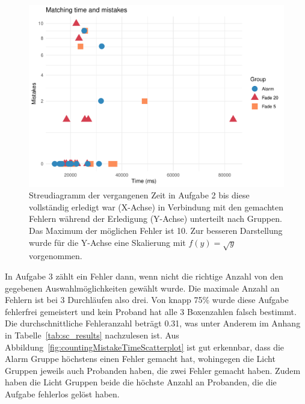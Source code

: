 \begin{figure}[H]
	\centering
	\includegraphics[width=\textwidth]{./_StudyResults/matchingMisTimeScat}
	\caption{Streudiagramm der vergangenen Zeit in Aufgabe 2 bis diese vollständig erledigt war (X-Achse) in Verbindung mit den gemachten Fehlern während der Erledigung (Y-Achse) unterteilt nach Gruppen. Das Maximum der möglichen Fehler ist 10. Zur besseren Darstellung wurde für die Y-Achse eine Skalierung mit $f(y) = \sqrt{y}$ vorgenommen.}
	\label{fig:matchingMistakeTimeScatterplot}
\end{figure}

In Aufgabe 3 zählt ein Fehler dann, wenn nicht die richtige Anzahl von den gegebenen Auswahlmöglichkeiten gewählt wurde. Die maximale Anzahl an Fehlern ist bei 3 Durchläufen also drei.
Von knapp 75\% wurde diese Aufgabe fehlerfrei gemeistert und kein Proband hat alle 3 Boxenzahlen falsch bestimmt. Die durchschnittliche Fehleranzahl beträgt 0.31, was unter Anderem im Anhang in Tabelle~\ref{tab:sc_results} nachzulesen ist.
Aus Abbildung~\ref{fig:countingMistakeTimeScatterplot} ist gut erkennbar, dass die Alarm Gruppe höchstens einen Fehler gemacht hat, wohingegen die Licht Gruppen jeweils auch Probanden haben, die zwei Fehler gemacht haben. Zudem haben die Licht Gruppen beide die höchste Anzahl an Probanden, die die Aufgabe fehlerlos gelöst haben.


